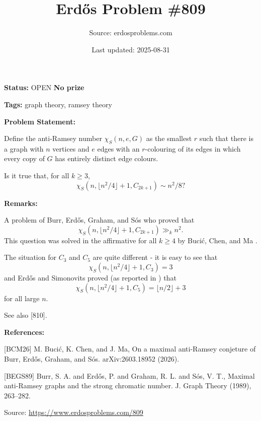 \documentclass{article}
\title{Erd\H{o}s Problem \#809}
\date{Last updated: 2025-08-31}
\author{Source: erdosproblems.com}
\begin{document}
\maketitle

\noindent\textbf{Status:} OPEN \quad \textbf{No prize}

\noindent\textbf{Tags:} graph theory, ramsey theory

\medskip
\noindent\textbf{Problem Statement:}

Define the anti-Ramsey number $\chi_S(n,e,G)$ as the smallest $r$ such that there is a graph with $n$ vertices and $e$ edges with an $r$-colouring of its edges in which every copy of $G$ has entirely distinct edge colours.

Is it true that, for all $k\geq 3$,\[\chi_S(n, \lfloor n^2/4\rfloor+1,C_{2k+1})\sim n^2/8?\]

\bigskip
\noindent\textbf{Remarks:}

A problem of Burr, Erd\H{o}s, Graham, and S\'{o}s \cite{BEGS89} who proved that\[\chi_S(n, \lfloor n^2/4\rfloor+1,C_{2k+1})\gg_k n^2.\]This question was solved in the affirmative for all $k\geq 4$ by Buci\'{c}, Chen, and Ma \cite{BCM26}.

The situation for $C_3$ and $C_5$ are quite different - it is easy to see that\[\chi_S(n, \lfloor n^2/4\rfloor+1,C_{3})=3\]and Erd\H{o}s and Simonovits proved (as reported in \cite{BEGS89}) that\[\chi_S(n, \lfloor n^2/4\rfloor+1,C_{5})=\lfloor n/2\rfloor+3\]for all large $n$.

See also [810].

\bigskip
\noindent\textbf{References:}

[BCM26] M. Buci\'{c}, K. Chen, and J. Ma, On a maximal anti-Ramsey conjeture of Burr, Erd\H{o}s, Graham, and S\'{o}s. arXiv:2603.18952 (2026).
 
 [BEGS89] Burr, S. A. and Erd\H{o}s, P. and Graham, R. L. and S\'os, V.
T., Maximal anti-{R}amsey graphs and the strong chromatic number. J. Graph Theory (1989), 263--282.

\bigskip
\noindent\small{Source: \url{https://www.erdosproblems.com/809}}
\end{document}
